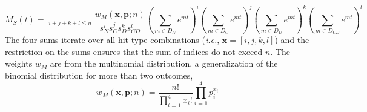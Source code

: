 \documentclass{article}
\newcommand{\multisum}{\ensuremath{\mathop{\sum_{i=0}^n \sum_{i=j}^n \sum_{k=0}^{n} \sum_{l=0}^n}_{i+j+k+l \le n} }}
\begin{document}

        \begin{equation}\label{eqn:multi-dot-mgf}
            M_S(t) = \mathop{\sum_{i=0}^n \sum_{i=j}^n \sum_{k=0}^{n} \sum_{l=0}^n}_{i+j+k+l \le n} 
            \frac{w_M(\textbf{x}, \textbf{p}; n)}{s_N^{i} s_C^j s_D^{k} s_{CD}^{l}} 
            \left(\sum_{m \in D_N} e^{m t}\right)^i 
            \left(\sum_{m \in D_C} e^{m t}\right)^{j} 
            \left(\sum_{m \in D_D} e^{m t}\right)^k
            \left(\sum_{m \in D_{CD}} e^{m t}\right)^l
        \end{equation}
        The four sums iterate over all hit-type combinations (\textit{i.e.}, $\textbf{x} = [i, j, k, l]$) and the restriction on the sums ensures that the sum of indices do not exceed $n$. The weights $w_M$ are from the multinomial distribution, a generalization of the binomial distribution for more than two outcomes,
        \begin{equation}
            w_M(\textbf{x}, \textbf{p};n) =  \frac{n!}{\prod_{i=1}^{4} x_i!}\prod_{i=1}^{4} p_i^{x_i}
        \end{equation}
\end{document}

